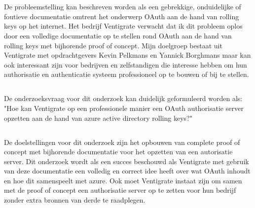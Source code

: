 
\chapter{}
\label{ch:inleiding}
\section{}
\label{sec:probleemstelling}

De probleemstelling kan beschreven worden als een gebrekkige, onduidelijke of foutieve documentatie omtrent het onderwerp OAuth aan de hand van rolling keys op het internet. Het bedrijf Ventigrate verwacht dat ik dit probleem oplos door een volledige documentatie op te stellen rond OAuth aan de hand van rolling keys met bijhorende proof of concept. \newline\newline
Mijn doelgroep bestaat uit Ventigrate met opdrachtgevers Kevin Pelkmans en Yannick Borghmans maar kan ook interessant zijn voor bedrijven en zelfstandigen die interesse hebben om hun authorisatie en authenticatie systeem professioneel op te bouwen of bij te stellen.

\section{}
\label{sec:onderzoeksvraag}

De onderzoeksvraag voor dit onderzoek kan duidelijk geformuleerd worden als: "Hoe kan Ventigrate op een professionele manier een OAuth authorisatie server opzetten aan de hand van azure active directory rolling keys?" 

\section{}
\label{sec:onderzoeksdoelstelling}

De doelstellingen voor dit onderzoek zijn het opbouwen van complete proof of concept met bijhorende documentatie voor het opzetten van een autorisatie server. Dit onderzoek wordt als een succes beschouwd als Ventigrate met gebruik van deze documentatie een volledig en correct idee heeft over wat OAuth inhoudt en hoe dit samenspeelt met azure. Ook moet Ventigrate instaat zijn om samen met de proof of concept een authorisatie server op te zetten voor hun bedrijf zonder extra bronnen van derde te raadplegen.


